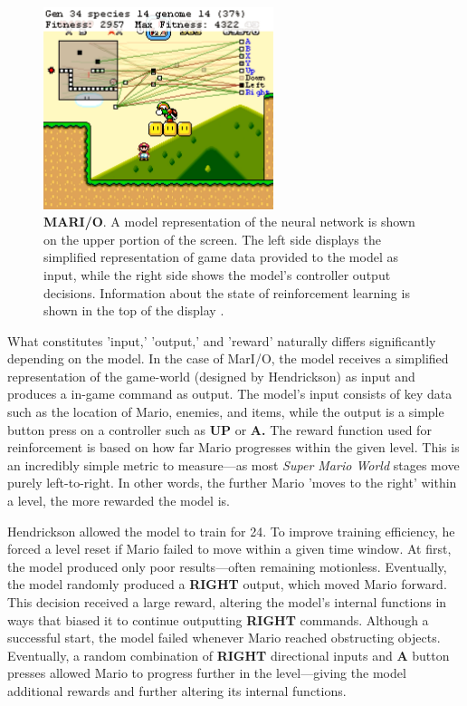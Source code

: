 \documentclass{report}
\newcommand{\tech}[1]{\textbf{#1}}
\begin{document}
\begin{figure}
    \centering
    \includegraphics[width=0.6\textwidth]{mario.png}
    \caption{\tech{MARI/O}. A model representation of the neural network is shown on the upper portion of the screen. The left side displays the simplified representation of game data provided to the model as input, while the right side shows the model's controller output decisions. Information about the state of reinforcement learning is shown in the top of the display \cite{Hendrickson_2015}.}
    \label{fig:mario}
\end{figure}



What constitutes 'input,' 'output,' and 'reward' naturally differs significantly depending on the model. In the case of MarI/O, the model receives a simplified representation of the game-world (designed by Hendrickson) as input and produces a in-game command as output. The model's input consists of key data such as the location of Mario, enemies, and items, while the output is a simple button press on a controller such as \tech{UP} or \tech{A.} The reward function used for reinforcement is based on how far Mario progresses within the given level. This is an incredibly simple metric to measure---as most \emph{Super Mario World} stages move purely left-to-right. In other words, the further Mario 'moves to the right' within a level, the more rewarded the model is. 

Hendrickson allowed the model to train for 24. To improve training efficiency, he forced a level reset if Mario failed to move within a given time window. At first, the model produced only poor results---often remaining motionless. Eventually, the model randomly produced a \tech{RIGHT} output, which moved Mario forward. This decision received a large reward, altering the model's internal functions in ways that biased it to continue outputting \tech{RIGHT} commands. Although a successful start, the model failed whenever Mario reached obstructing objects. Eventually, a random combination of \tech{RIGHT} directional inputs and \tech{A} button presses allowed Mario to progress further in the level---giving the model additional rewards and further altering its internal functions. 
\end{document}
